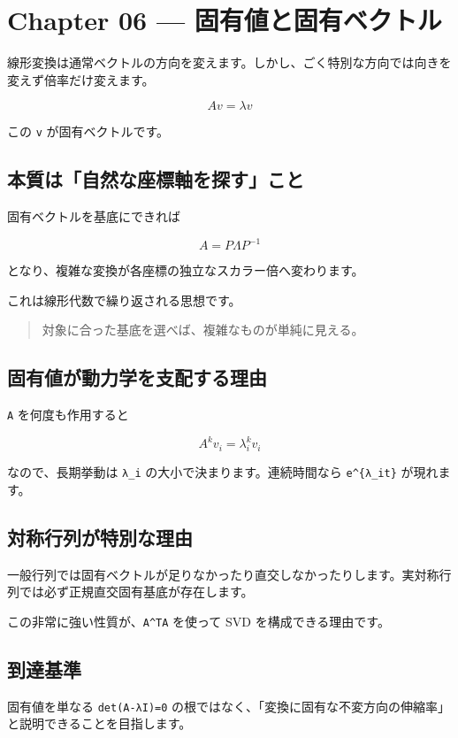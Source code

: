 \documentclass[
  11pt,
  a4paper,
]{ltjsarticle}
\author{}
\date{}
\begin{document}
\hypertarget{chapter-06-ux56faux6709ux5024ux3068ux56faux6709ux30d9ux30afux30c8ux30eb}{%
\section{Chapter 06 ---
固有値と固有ベクトル}\label{chapter-06-ux56faux6709ux5024ux3068ux56faux6709ux30d9ux30afux30c8ux30eb}}

線形変換は通常ベクトルの方向を変えます。しかし、ごく特別な方向では向きを変えず倍率だけ変えます。

\[
Av=\lambda v
\]

この \texttt{v} が固有ベクトルです。

\hypertarget{ux672cux8ceaux306fux81eaux7136ux306aux5ea7ux6a19ux8ef8ux3092ux63a2ux3059ux3053ux3068}{%
\subsection{本質は「自然な座標軸を探す」こと}\label{ux672cux8ceaux306fux81eaux7136ux306aux5ea7ux6a19ux8ef8ux3092ux63a2ux3059ux3053ux3068}}

固有ベクトルを基底にできれば

\[
A=P\Lambda P^{-1}
\]

となり、複雑な変換が各座標の独立なスカラー倍へ変わります。

これは線形代数で繰り返される思想です。

\begin{quote}
対象に合った基底を選べば、複雑なものが単純に見える。
\end{quote}

\hypertarget{ux56faux6709ux5024ux304cux52d5ux529bux5b66ux3092ux652fux914dux3059ux308bux7406ux7531}{%
\subsection{固有値が動力学を支配する理由}\label{ux56faux6709ux5024ux304cux52d5ux529bux5b66ux3092ux652fux914dux3059ux308bux7406ux7531}}

\texttt{A} を何度も作用すると

\[
A^kv_i=\lambda_i^kv_i
\]

なので、長期挙動は \texttt{\textbar{}λ\_i\textbar{}}
の大小で決まります。連続時間なら \texttt{e\^{}\{λ\_it\}} が現れます。

\hypertarget{ux5bfeux79f0ux884cux5217ux304cux7279ux5225ux306aux7406ux7531}{%
\subsection{対称行列が特別な理由}\label{ux5bfeux79f0ux884cux5217ux304cux7279ux5225ux306aux7406ux7531}}

一般行列では固有ベクトルが足りなかったり直交しなかったりします。実対称行列では必ず正規直交固有基底が存在します。

この非常に強い性質が、\texttt{A\^{}TA} を使って SVD
を構成できる理由です。

\hypertarget{ux5230ux9054ux57faux6e96}{%
\subsection{到達基準}\label{ux5230ux9054ux57faux6e96}}

固有値を単なる \texttt{det(A-λI)=0}
の根ではなく、「変換に固有な不変方向の伸縮率」と説明できることを目指します。
\end{document}
